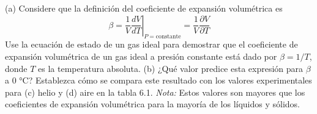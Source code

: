 \item (a) Considere que la definición del coeficiente de expansión volumétrica es
$$\beta = \frac{1}{V} \left. \frac{dV}{dT} \right|_{P = \text{constante}} = \frac{1}{V} \frac{\partial V}{\partial T}$$
Use la ecuación de estado de un gas ideal para demostrar que el coeficiente de expansión volumétrica de un gas ideal a presión constante está dado por $\beta = 1/T$, donde $T$ es la temperatura absoluta. (b) ¿Qué valor predice esta expresión para $\beta$ a 0 °C? Establezca cómo se compara este resultado con los valores experimentales para (c) helio y (d) aire en la tabla 6.1. \textit{Nota:} Estos valores son mayores que los coeficientes de expansión volumétrica para la mayoría de los líquidos y sólidos.
